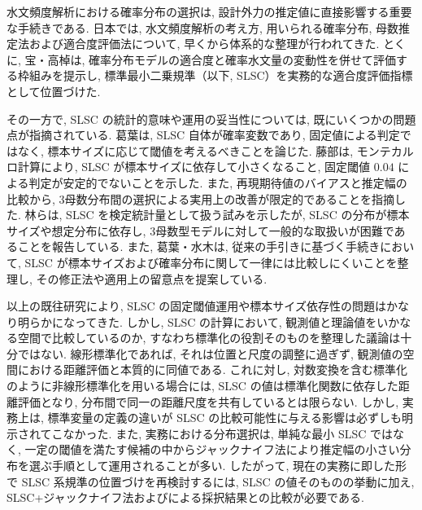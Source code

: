 水文頻度解析における確率分布の選択は, 設計外力の推定値に直接影響する重要な手続きである.
日本では, 水文頻度解析の考え方, 用いられる確率分布, 母数推定法および適合度評価法について, 早くから体系的な整理が行われてきた{\cite{Takara1998}}.
とくに, 宝・高棹は, 確率分布モデルの適合度と確率水文量の変動性を併せて評価する枠組みを提示し, 標準最小二乗規準（以下, SLSC）を実務的な適合度評価指標として位置づけた{\cite{TakaraTakasao1988}}.

その一方で, SLSC の統計的意味や運用の妥当性については, 既にいくつかの問題点が指摘されている.
葛葉は, SLSC 自体が確率変数であり, 固定値による判定ではなく, 標本サイズに応じて閾値を考えるべきことを論じた{\cite{Kuzuha2010}}.
藤部は, モンテカルロ計算により, SLSC が標本サイズに依存して小さくなること, 固定閾値 $0.04$ による判定が安定的でないことを示した.
また, 再現期待値のバイアスと推定幅の比較から, 3母数分布間の選択による実用上の改善が限定的であることを指摘した{\cite{Fujibe2011}}.
林らは, SLSC を検定統計量として扱う試みを示したが, SLSC の分布が標本サイズや想定分布に依存し, 3母数型モデルに対して一般的な取扱いが困難であることを報告している{\cite{HayashiEtAl2012}}.
また, 葛葉・水木は, 従来の手引きに基づく手続きにおいて, SLSC が標本サイズおよび確率分布に関して一律には比較しにくいことを整理し, その修正法や適用上の留意点を提案している{\cite{KuzuhaMizuki2021,KuzuhaMizuki2022}}.

以上の既往研究により, SLSC の固定閾値運用や標本サイズ依存性の問題はかなり明らかになってきた.
しかし, SLSC の計算において, 観測値と理論値をいかなる空間で比較しているのか, すなわち標準化の役割そのものを整理した議論は十分ではない.
線形標準化であれば, それは位置と尺度の調整に過ぎず, 観測値の空間における距離評価と本質的に同値である.
これに対し, 対数変換を含む標準化のように非線形標準化を用いる場合には, SLSC の値は標準化関数に依存した距離評価となり, 分布間で同一の距離尺度を共有しているとは限らない.
しかし, 実務上は, 標準変量の定義の違いが SLSC の比較可能性に与える影響は必ずしも明示されてこなかった.
また, 実務における分布選択は, 単純な最小 SLSC ではなく, 一定の閾値を満たす候補の中からジャックナイフ法により推定幅の小さい分布を選ぶ手順として運用されることが多い{\cite{Fujibe2011}}.
したがって, 現在の実務に即した形で SLSC 系規準の位置づけを再検討するには, SLSC の値そのものの挙動に加え, SLSC+ジャックナイフ法およびによる採択結果との比較が必要である.

